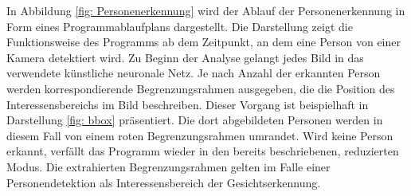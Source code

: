 	In Abbildung \ref{fig: Personenerkennung} wird der Ablauf der Personenerkennung in Form eines Programmablaufplans dargestellt. Die Darstellung zeigt die Funktionsweise des Programms ab dem Zeitpunkt, an dem eine Person von einer Kamera detektiert wird. Zu Beginn der Analyse gelangt jedes Bild in das verwendete künstliche neuronale Netz. Je nach Anzahl der erkannten Person werden korrespondierende Begrenzungsrahmen ausgegeben, die die Position des Interessensbereichs im Bild beschreiben. Dieser Vorgang ist beispielhaft in Darstellung \ref{fig: bbox} präsentiert. Die dort abgebildeten Personen werden in diesem Fall von einem roten Begrenzungsrahmen umrandet. Wird keine Person erkannt, verfällt das Programm wieder in den bereits beschriebenen, reduzierten Modus. Die extrahierten Begrenzungsrahmen gelten im Falle einer Personendetektion als Interessensbereich der Gesichtserkennung.\\
	
